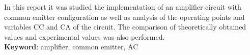  \setlength{\absparsep}{18pt} %
\begin{resumo}[Abstract]
In this report it was studied the implementation of an amplifier circuit with common emitter configuration as well as analysis of the operating points and variables CC and CA of the circuit. The comparison of theoretically obtained values and experimental values was also performed.\\
\noindent
\textbf{Keyword}: amplifier, common emitter, AC
\end{resumo} 
